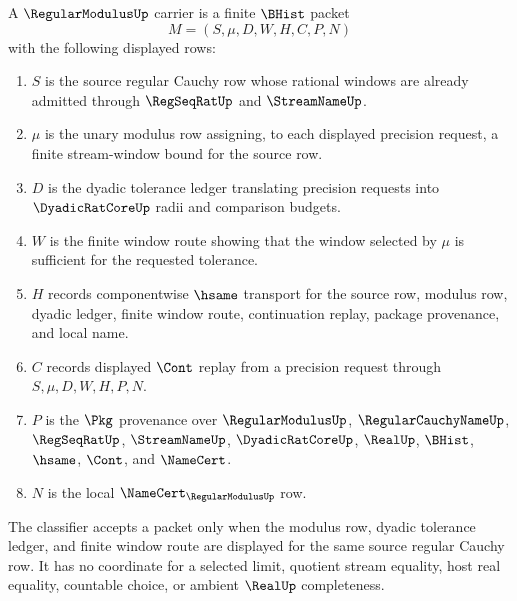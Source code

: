 \begin{definition}
\label{def:regular-modulus-carrier}
A $\RegularModulusUp$ carrier is a finite $\BHist$ packet
$$
M=(S,\mu,D,W,H,C,P,N)
$$
with the following displayed rows:
\begin{enumerate}
\item $S$ is the source regular Cauchy row whose rational windows are already admitted through $\RegSeqRatUp$ and $\StreamNameUp$.
\item $\mu$ is the unary modulus row assigning, to each displayed precision request, a finite stream-window bound for the source row.
\item $D$ is the dyadic tolerance ledger translating precision requests into $\DyadicRatCoreUp$ radii and comparison budgets.
\item $W$ is the finite window route showing that the window selected by $\mu$ is sufficient for the requested tolerance.
\item $H$ records componentwise $\hsame$ transport for the source row, modulus row, dyadic ledger, finite window route, continuation replay, package provenance, and local name.
\item $C$ records displayed $\Cont$ replay from a precision request through $S,\mu,D,W,H,P,N$.
\item $P$ is the $\Pkg$ provenance over $\RegularModulusUp$, $\RegularCauchyNameUp$, $\RegSeqRatUp$, $\StreamNameUp$, $\DyadicRatCoreUp$, $\RealUp$, $\BHist$, $\hsame$, $\Cont$, and $\NameCert$.
\item $N$ is the local $\NameCert_{\RegularModulusUp}$ row.
\end{enumerate}
The classifier accepts a packet only when the modulus row, dyadic tolerance ledger, and finite window route are displayed for the same source regular Cauchy row. It has no coordinate for a selected limit, quotient stream equality, host real equality, countable choice, or ambient $\RealUp$ completeness.
\end{definition}

